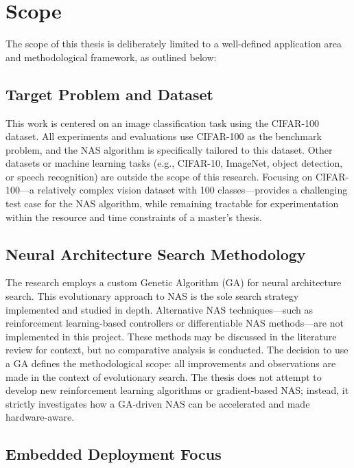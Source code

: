 \section{Scope}

The scope of this thesis is deliberately limited to a well-defined application area and methodological framework, as outlined below:

\subsection{Target Problem and Dataset}

This work is centered on an image classification task using the CIFAR-100 dataset. All experiments and evaluations use CIFAR-100 as the benchmark problem, and the NAS algorithm is specifically tailored to this dataset. Other datasets or machine learning tasks (e.g., CIFAR-10, ImageNet, object detection, or speech recognition) are outside the scope of this research. Focusing on CIFAR-100—a relatively complex vision dataset with 100 classes—provides a challenging test case for the NAS algorithm, while remaining tractable for experimentation within the resource and time constraints of a master’s thesis.

\subsection{Neural Architecture Search Methodology}

The research employs a custom Genetic Algorithm (GA) for neural architecture search. This evolutionary approach to NAS is the sole search strategy implemented and studied in depth. Alternative NAS techniques—such as reinforcement learning-based controllers or differentiable NAS methods—are not implemented in this project. These methods may be discussed in the literature review for context, but no comparative analysis is conducted. The decision to use a GA defines the methodological scope: all improvements and observations are made in the context of evolutionary search. The thesis does not attempt to develop new reinforcement learning algorithms or gradient-based NAS; instead, it strictly investigates how a GA-driven NAS can be accelerated and made hardware-aware.

\subsection{Embedded Deployment Focus}

